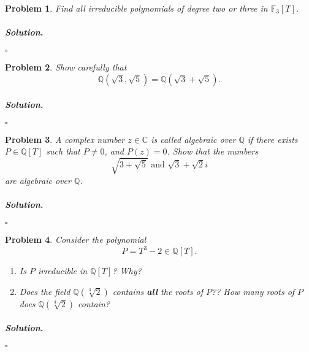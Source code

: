 \documentclass[reqno]{amsart}
\theoremstyle{plain}
\newtheorem{problem}{Problem}
\theoremstyle{definition}
\newenvironment{solution}{\paragraph{\emph{Solution}.}}{\hfill$\square$}
\begin{document}
\begin{problem}
Find all irreducible polynomials of degree two or three in $\mathbb{F}_{3}[T]$.
\end{problem}
\begin{solution}

\end{solution} 

\begin{problem}
Show carefully that
$$\mathbb{Q}(\sqrt{3},\sqrt{5}) = \mathbb{Q}(\sqrt{3} + \sqrt{5}). $$
\end{problem}
\begin{solution}

\end{solution} 

\begin{problem}
A complex number $z \in \mathbb{C}$ is called algebraic over $\mathbb{Q}$ if there exists $P \in \mathbb{Q}[T]$ such that $P \neq 0$, and $P(z) = 0$.  Show that the numbers
$$\sqrt{3 + \sqrt{5}} \text{ and } \sqrt{3} + \sqrt{2}i$$
are algebraic over $\mathbb{Q}$.
\end{problem}
\begin{solution}

\end{solution} 

\begin{problem}
Consider the polynomial 
$$P = T^{3} - 2 \in \mathbb{Q}[T]. $$
\begin{enumerate}
\item Is $P$ irreducible in $\mathbb{Q}[T]$?  Why?
\item Does the field $\mathbb{Q}(\sqrt[3]{2})$ contains {\bfseries all} the roots of $P$??  How many roots of $P$ does $\mathbb{Q}(\sqrt[3]{2})$ contain?
\end{enumerate}
\end{problem}
\begin{solution}

\end{solution} 
\end{document}

